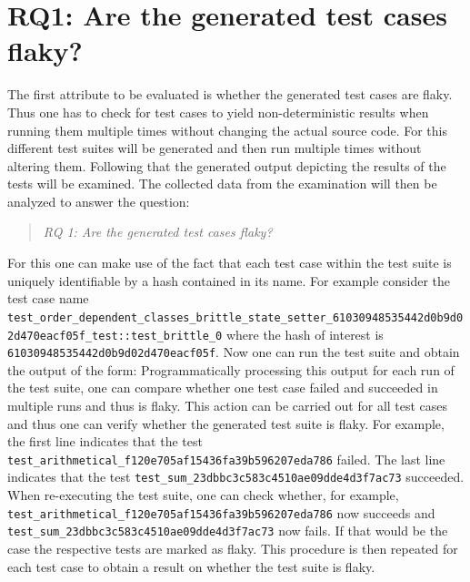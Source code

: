 \documentclass[
fancyheadings, %
%
%
]{stsreprt}
\begin{document}
\section{RQ1: Are the generated test cases flaky?}
The first attribute to be evaluated is whether the generated test cases are flaky. 
Thus one has to check for test cases to yield non-deterministic results when running them multiple times without changing the actual source code. 
For this different test suites will be generated and then run multiple times without altering them. 
Following that the generated output depicting the results of the tests will be examined.
The collected data from the examination will then be analyzed to answer the question: 
\begin{quote}\emph{RQ 1: Are the generated test cases flaky?}\end{quote}
For this one can make use of the fact that each test case within the test suite is uniquely identifiable by a hash contained in its name. 
For example consider the test case name \lstinline{test_order_dependent_classes_brittle_state_setter_61030948535442d0b9d02d470eacf05f_test::test_brittle_0} where the hash of interest is \lstinline{61030948535442d0b9d02d470eacf05f}.
Now one can run the test suite and obtain the output of the form:
{\small }
Programmatically processing this output for each run of the test suite, one can compare whether one test case failed and succeeded in multiple runs and thus is flaky. This action can be carried out for all test cases and thus one can verify whether the generated test suite is flaky.
For example, the first line indicates that the test \lstinline{test_arithmetical_f120e705af15436fa39b596207eda786} failed. 
The last line indicates that the test \lstinline{test_sum_23dbbc3c583c4510ae09dde4d3f7ac73} succeeded.
When re-executing the test suite, one can check whether, for example, \lstinline{test_arithmetical_f120e705af15436fa39b596207eda786} now succeeds and \lstinline{test_sum_23dbbc3c583c4510ae09dde4d3f7ac73} now fails. 
If that would be the case the respective tests are marked as flaky. 
This procedure is then repeated for each test case to obtain a result on whether the test suite is flaky.
\end{document}
